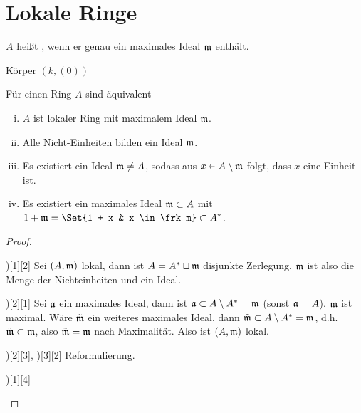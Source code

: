 \section{Lokale Ringe}


\begin{df}
    $A$ heißt , wenn er genau ein maximales Ideal $\mathfrak{m}$ enthält.
\end{df}

\begin{ex}
    Körper $(k, (0))$
\end{ex}

\begin{st}
    Für einen Ring $A$ sind äquivalent
    \begin{enumerate}[i)]
        \item
            $A$ ist lokaler Ring mit maximalem Ideal $\mathfrak{m}$.
        \item
            Alle Nicht-Einheiten bilden ein Ideal $\mathfrak{m}$.
        \item
            Es existiert ein Ideal $\mathfrak{m} \neq A$, sodass aus $x \in A \setminus \mathfrak{m}$ folgt, dass $x$ eine Einheit ist.
        \item
            Es existiert ein maximales Ideal $\mathfrak{m} \subset A$ mit $1 + \frk m = \Set{1 + x & x \in \frk m} \subset A^*$.
    \end{enumerate}
    \begin{proof}
        \begin{seg}{\ProofImplication)[1][2]}
            Sei $(A, \mathfrak{m})$ lokal, dann ist $A = A^* \sqcup \mathfrak{m}$ disjunkte Zerlegung.
            $\mathfrak{m}$ ist also die Menge der Nichteinheiten und ein Ideal.
        \end{seg}
        \begin{seg}{\ProofImplication)[2][1]}
            Sei $\mathfrak{a}$ ein maximales Ideal, dann ist $\mathfrak{a} \subset A \setminus A^* = \mathfrak{m}$ (sonst $\mathfrak{a} = A$).
            $\mathfrak{m}$ ist maximal.
            Wäre $\tilde{\mathfrak{m}}$ ein weiteres maximales Ideal, dann $\tilde{\mathfrak{m}} \subset A \setminus A^* = \mathfrak{m}$, d.h. $\tilde{\mathfrak{m}} \subset \mathfrak{m}$, also $\tilde{\mathfrak{m}} = \mathfrak{m}$ nach Maximalität.
            Also ist $(A, \mathfrak{m})$ lokal.
        \end{seg}
        \begin{seg}{\ProofImplication)[2][3], \ProofImplication)[3][2]}
            Reformulierung.
        \end{seg}
        \begin{seg}{\ProofImplication)[1][4]}

\end{seg}
\end{proof}
\end{st}
